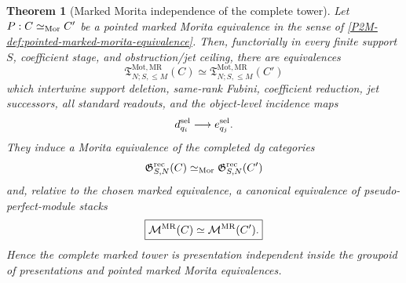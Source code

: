 \documentclass[11pt]{article}
\newtheorem{theorem}{Theorem}[section]
\theoremstyle{remark}
\newcommand{\Mot}{\mathrm{Mot}}
\newcommand{\MR}{\mathrm{MR}}
\begin{document}
\begin{theorem}[Marked Morita independence of the complete tower]
\label{P2M-thm:marked-morita-presentation-independence}
\label{problem:morita-presentation-independence}
Let \(P:C\simeq_{\rm Mor}C'\) be a pointed marked Morita equivalence in the
sense of \cref{P2M-def:pointed-marked-morita-equivalence}.  Then, functorially
in every finite support \(S\), coefficient stage, and obstruction/jet ceiling,
there are equivalences
\begin{equation}
 \boxed{
 \mathfrak T^{\Mot,\MR}_{N;S,\le M}(C)
 \simeq
 \mathfrak T^{\Mot,\MR}_{N;S,\le M}(C')}
 \label{P2M-eq:marked-morita-finite-tower}
\end{equation}
which intertwine support deletion, same-rank Fubini, coefficient reduction,
jet successors, all standard readouts, and the object-level incidence maps
\[
 d_{q_i}^{\rm sel}\longrightarrow e_{q_j}^{\rm sel}.
\]
They induce a Morita equivalence of the completed dg categories
\[
 \mathfrak G^{\rm rec}_{S,N}(C)
 \simeq_{\rm Mor}
 \mathfrak G^{\rm rec}_{S,N}(C')
\]
and, relative to the chosen marked equivalence, a canonical equivalence of
pseudo-perfect-module stacks
\begin{equation}
 \boxed{
 \mathcal M^{\rm MR}(C)\simeq\mathcal M^{\rm MR}(C').}
 \label{P2M-eq:marked-morita-stack}
\end{equation}
Hence the complete marked tower is presentation independent inside the
groupoid of presentations and pointed marked Morita equivalences.
\end{theorem}
\end{document}
